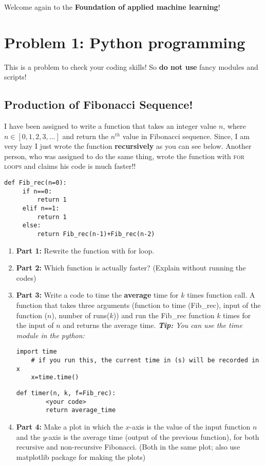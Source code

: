 \documentclass[12pt,letterpaper]{article}
\begin{document}
Welcome again to the \textbf{Foundation of applied machine learning}! 

\section*{Problem 1: Python programming}
This is a problem to check your coding skills! So \textbf{do not use} fancy modules and scripts!  

\subsection*{Production of Fibonacci Sequence!}
I have been assigned to write a function that takes an integer value $n$, where $n\in [0,1,2,3,...]$ and return the $n^{th}$ value in Fibonacci sequence. Since, I am very lazy I just wrote the function \textbf{recursively} as you can see below. Another person, who was assigned to do the same thing, wrote the function with \textsc{for loops} and claims his code is much faster!! 

     \begin{lstlisting}[style = Python]
     def Fib_rec(n=0):
     if n==0:
         return 1
     elif n==1:
         return 1
     else:
         return Fib_rec(n-1)+Fib_rec(n-2)
    \end{lstlisting}


\begin{enumerate}
  \item
   \textbf{Part 1:} Rewrite the function with for loop.
  \item
   \textbf{Part 2:} Which function is actually faster? (Explain without running the codes)
  \item
   \textbf{Part 3:} Write a code to time the \textbf{average} time for $k$ times function call. A function that takes three arguments (function to time (Fib\_rec), input of the function ($n$), number of runs($k$)) and run the Fib\_rec function $k$ times for the input of $n$ and returns the average time.
   \textit{\textbf{Tip:} You can use the time module in the python:}
    \begin{lstlisting}[style = Python]
    import time
    # if you run this, the current time in (s) will be recorded in  x
    x=time.time() 
    \end{lstlisting}
    
    \begin{lstlisting}[style = Python]
    def timer(n, k, f=Fib_rec):
    	<your code>
    	return average_time
    \end{lstlisting}
  \item
   \textbf{Part 4:} Make a plot in which the $x$-axis is the value of the input function $n$ and the $y$-axis is the average time (output of the previous function), for both recursive and non-recursive Fibonacci. (Both in the same plot; also use matplotlib package for making the plots) 
\end{enumerate}
\end{document}
